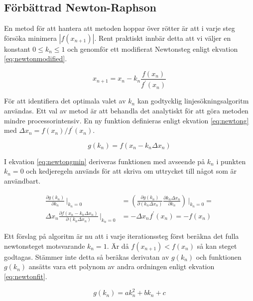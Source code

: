 \subsection{Förbättrad Newton-Raphson}

En metod för att hantera att metoden hoppar över rötter är att i varje steg försöka minimera $|f(x_{n+1})|$.
Rent praktiskt innbär detta att vi väljer en konstant $0 \le k_n \le 1$ och genomför ett modifierat
Newtonsteg enligt ekvation \eqref{eq:newtonmodified}.

\begin{equation}
\label{eq:newtonmodified}
x_{n+1} = x_n - k_n\frac{f(x_n)}{f^\prime(x_n)}
\end{equation}

\noindent
För att identifiera det optimala valet av $k_n$ kan godtycklig linjesökningsalgoritm användas. Ett val av metod
är att behandla det analytiskt för att göra metoden mindre processorintensiv. En ny funktion definieras
enligt ekvation \eqref{eq:newtong} med $\Delta x_n = f(x_n)/f^\prime(x_n)$.

\begin{equation}
\label{eq:newtong}
g(k_n) = f(x_n- k_n\Delta x_n)
\end{equation}

\noindent
I ekvation \eqref{eq:newtongmin} deriveras funktionen med avseende på $k_n$ i punkten $k_n=0$
och kedjeregeln används för att skriva om uttrycket till något som är användbart.

\begin{align}
\frac{\partial g(k_n)}{\partial k_n}\,\bigg|_{k_n=0} & = 
\left(\frac{\partial g(k_n)}{\partial (k_n\Delta x_n)}
\frac{\partial k_n \Delta x_n}{\partial k_n}\right)\,\bigg|_{k_n=0} = \nonumber \\
\Delta x_n \frac{\partial f(x_n- k_n\Delta x_n)}{\partial (k_n\Delta x_n)}\,\bigg|_{k_n=0} & = 
-\Delta x_n f^\prime(x_n) = - f(x_n)
\label{eq:newtongmin}
\end{align}

\noindent
Ett förslag på algoritm är nu att i varje iterationssteg först beräkna det fulla newtonsteget motsvarande $k_n=1$.
Är då $f(x_{n+1}) < f(x_n)$ så kan steget godtagas. Stämmer inte detta så beräkas derivatan av $g(k_n)$ och
funktionen $g(k_n)$ ansätts vara ett polynom av andra ordningen enligt ekvation \eqref{eq:newtonfit}.

\begin{equation}
\label{eq:newtonfit}
g(k_n) = ak^2_n + bk_n + c
\end{equation}

